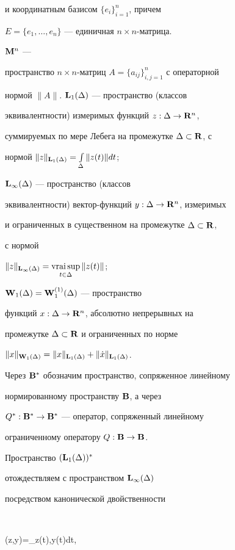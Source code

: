 и координатным базисом $\{e_i\}_{i=1}^n$, причем 


$E=\{e_1,\dotsc,e_n\}$ --- единичная $n\times n$-матрица.


$\bold M^n$ ---


пространство $n\times n$-матриц $A=\{a_{ij}\}_{i,j=1}^n$ с операторной


нормой $\|A\|$. $\bold L_1(\Delta)$ --- пространство (классов


эквивалентности) измеримых функций $z:\Delta\to\bold R^n$,


суммируемых по мере Лебега на промежутке $\Delta\subset\bold R$, с


нормой $\|z\|_{\bold L_1(\Delta)}=\int\limits_\Delta\|z(t)\|dt$;


$\bold L_\infty(\Delta)$ --- пространство (классов


эквивалентности) вектор-функций $y:\Delta\to\bold R^n$, измеримых


и ограниченных в существенном на промежутке $\Delta\subset\bold R$,


с нормой


$\|z\|_{\bold L_\infty(\Delta)}=\vraisup\limits_{t\in\Delta}\|z(t)\|$;


$\bold W_1(\Delta)=\bold W_1^{(1)}(\Delta)$ --- пространство


функций $x:\Delta\to\bold R^n$, абсолютно непрерывных на


промежутке $\Delta\subset\bold R$ и ограниченных по норме


$\|x\|_{\bold W_1(\Delta)}=\|x\|_{\bold L_1(\Delta)}+\|\Dot


x\|_{\bold L_1(\Delta)}$.





Через $\bold B^*$ обозначим пространство, сопряженное линейному


нормированному пространству $\bold B$, а через 


$Q^*:\bold B^*\to\bold B^*$ --- оператор, сопряженный линейному


ограниченному оператору $Q:\bold B\to\bold B$.


Пространство $(\bold L_1(\Delta))^*$


отождествляем с пространством $\bold L_\infty(\Delta)$


посредством канонической двойственности


%


$$


(z,y)=\int_\Delta\langle z(t),y(t)\rangle dt,


